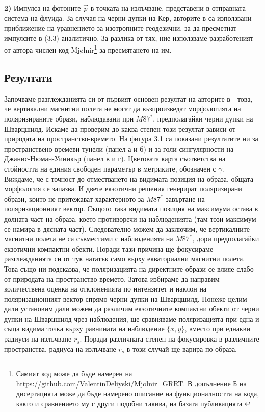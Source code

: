\documentclass[12pt]{article}
\numberwithin{equation}{section}
\numberwithin{figure}{section}
\begin{document}
	\textbf{2)} Импулса на фотоните $\vec{p}$ в точката на излъчване, представени в отправната система на флуида. За случая на черни дупки на Кер, авторите в \cite{Narayan2021} са използвани приближение на уравнението за изотропните геодезични, за да пресметнат импулсите в (3.3) аналитично. За разлика от тях, ние използваме разработеният от автора числен код Mjølnir\footnote{Самият код може да бъде намерен на https://github.com/ValentinDeliyski/Mjolnir\_GRRT. В допълнение Б на дисертацията може да бъде намерено описание на функционалността на кода, както и сравнението му с други подобни такива, на базата публикацията \cite{Gold2020}} за пресмятането на им.
	
	\subsection{Резултати}
	
	Започваме разглежданията си от първият основен резултат на авторите в \cite{Narayan2021} - това, че вертикални магнитни полета не могат да възпроизведат морфологията на поляризираните образи, наблюдавани при $M87^*$, предполагайки черни дупки на Шварцшилд. Искаме да проверим до каква степен този резултат зависи от природата на пространство-времето. На фигура 3.1 са показани резултатите ни за пространствено-времеви тунели (панел а и б) и за голи сингулярности на Джанис-Нюман-Уиникър (панел в и г). Цветовата карта съответства на стойността на единия свободен параметър в метриките, обозначен с $\gamma$. \\
	
	Виждаме, че с точност до отместването на видимата позиция на образа, общата морфология се запазва. И двете екзотични решения генерират поляризирани образи, които не притежават характерното за $M87^*$ завъртане на поляризационният вектор. Същото така видимата позиция на максимума остава в долната част на образа, което противоречи на наблюденията (там този максимум се намира в дясната част). Следователно можем да заключим, че вертикалните магнитни полета не са съвместими с наблюденията на $M87^*$, дори предполагайки екзотични компактни обекти. Поради тази причина ще фокусираме разглежданията си от тук нататък само върху екваториални магнитни полета. \\
	
	Това също ни подсказва, че поляризацията на директните образи се влияе слабо от природата на пространство-времето. Затова избираме да направим количествена оценка на отклоненията по интензитет и наклон на поляризационният вектор спрямо черни дупки на Шварцшилд. Понеже целим дали установим дали можем да различим екзотичните компактни обекти от черни дупки на Шварцшилд чрез наблюдения, ще сравняваме поляризацията при една и съща видима точка върху равнината на наблюдение $\{x,y\}$, вместо при еднакви радиуси на излъчване $r_s$. Поради различната степен на фокусировка в различните пространства, радиуса на излъчване $r_s$ в този случай ще варира по образа.\\
\end{document}
